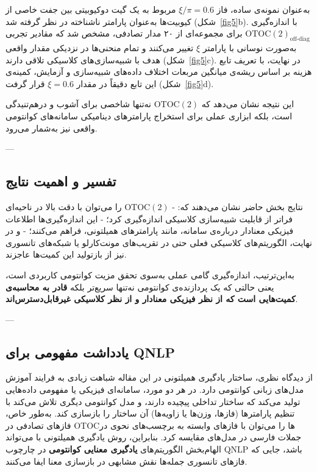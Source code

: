 به‌عنوان نمونه‌ی ساده، فاز \(\xi/\pi = 0.6\) مربوط به یک گیت دوکیوبیتی بین جفت خاصی از کیوبیت‌ها به‌عنوان پارامتر ناشناخته در نظر گرفته شد (شکل~\ref{fig5}b).  
با اندازه‌گیری \(\mathrm{OTOC(2)}_{\text{off-diag}}\) برای مجموعه‌ای از ۲۰ مدار تصادفی، مشخص شد که مقادیر تجربی به‌صورت نوسانی با پارامتر \(\xi\) تغییر می‌کنند و تمام منحنی‌ها در نزدیکی مقدار واقعی هدف با شبیه‌سازی‌های کلاسیکی تلاقی دارند (شکل~\ref{fig5}c).  
در نهایت، با تعریف تابع هزینه بر اساس ریشه‌ی میانگین مربعات اختلاف داده‌های شبیه‌سازی و آزمایش، کمینه‌ی این تابع دقیقاً در مقدار \(\xi = 0.6\) قرار گرفت (شکل~\ref{fig5}d).  

این نتیجه نشان می‌دهد که \(\mathrm{OTOC(2)}\) نه‌تنها شاخصی برای آشوب و درهم‌تنیدگی است، بلکه ابزاری عملی برای استخراج پارامترهای دینامیکی سامانه‌های کوانتومی واقعی نیز به‌شمار می‌رود.

---

\subsection{تفسیر و اهمیت نتایج}

نتایج بخش حاضر نشان می‌دهند که:
- \(\mathrm{OTOC(2)}\) را می‌توان با دقت بالا در ناحیه‌ای فراتر از قابلیت شبیه‌سازی کلاسیکی اندازه‌گیری کرد؛  
- این اندازه‌گیری‌ها اطلاعات فیزیکی معنادار درباره‌ی سامانه، مانند پارامترهای همیلتونی، فراهم می‌کنند؛  
- و در نهایت، الگوریتم‌های کلاسیکی فعلی حتی در تقریب‌های مونت‌کارلو یا شبکه‌های تانسوری نیز از بازتولید این کمیت‌ها عاجزند.

به‌این‌ترتیب، اندازه‌گیری  گامی عملی به‌سوی تحقق مزیت کوانتومی کاربردی است، یعنی حالتی که یک پردازنده‌ی کوانتومی نه‌تنها سریع‌تر بلکه \textbf{قادر به محاسبه‌ی کمیت‌هایی است که از نظر فیزیکی معنا‌دار و از نظر کلاسیکی غیرقابل‌دسترس‌اند}.

---

\subsection{یادداشت مفهومی برای QNLP}

از دیدگاه نظری، ساختار یادگیری همیلتونی در این مقاله شباهت زیادی به فرایند آموزش مدل‌های زبانی کوانتومی دارد.  
در هر دو مورد، سامانه‌ای فیزیکی یا مفهومی داده‌هایی تولید می‌کند که ساختار تداخلی پیچیده دارند، و مدل کوانتومی دیگری تلاش می‌کند با تنظیم پارامترها (فازها، وزن‌ها یا زاویه‌ها) آن ساختار را بازسازی کند.  
به‌طور خاص، فازهای تصادفی در OTOCها را می‌توان با فازهای وابسته به برچسب‌های نحوی در جملات فارسی در مدل‌های  مقایسه کرد.  
بنابراین، روش یادگیری همیلتونی با  می‌تواند الهام‌بخش الگوریتم‌های \textbf{یادگیری معنایی کوانتومی} در چارچوب QNLP باشد، جایی که فازهای تانسوری جمله‌ها نقش مشابهی در بازسازی معنا ایفا می‌کنند.

